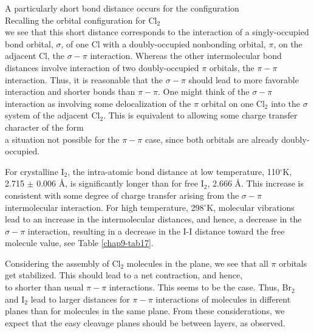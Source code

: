 A particularly short bond distance occurs for the configuration
\begin{equation}
\label{chap9-eqno16}
\end{equation}
Recalling the orbital configuration for Cl$_2$
\begin{equation}
\label{chap9-eqno17}
\end{equation}
we see that this short distance corresponds to the interaction of a 
singly-occupied bond orbital, $\sigma$, of one Cl with a doubly-occupied 
nonbonding orbital, $\pi$, on the adjacent Cl, the $\sigma - \pi$ 
interaction.  Whereas the other intermolecular bond distances involve 
interaction of two doubly-occupied $\pi$ orbitals, the $\pi-\pi$ 
interaction.  Thus, it is reasonable that the $\sigma-\pi$ should lead to more
favorable interaction and shorter bonds than $\pi-\pi$.  One might 
think of the $\sigma-\pi$ interaction as involving some delocalization of 
the $\pi$ orbital on one Cl$_2$ into the $\sigma$ system of the adjacent 
Cl$_2$. This is equivalent to allowing some charge transfer character of 
the form
\begin{equation}
\label{chap9-eqno18}
\end{equation}
a situation not possible for the $\pi-\pi$ case, since both orbitals 
are already doubly-occupied.

For crystalline I$_2$, the intra-atomic bond distance at low temperature, 
110$^{\circ}$K, 2.715 $\pm$ 0.006 \AA, is significantly longer than for 
free I$_2$, 2.666 \AA.  This increase is consistent with some degree
of charge transfer arising from the $\sigma-\pi$ intermolecular 
interaction.  For high temperature, 298$^{\circ}$K, molecular vibrations 
lead to an increase in the intermolecular distances, and hence, a decrease in
the $\sigma-\pi$ interaction, resulting in a decrease in the I-I distance 
toward the free molecule value, see Table \ref{chap9-tab17}.

Considering the assembly of Cl$_2$ molecules in the plane, we see that 
all $\pi$ orbitals get stabilized.  This should lead to a net 
contraction, and hence,
\begin{equation}
\label{chap9-eqno19}
\end{equation}
to shorter than usual $\pi-\pi$ interactions.  This seems to be the 
case.  Thus, Br$_2$ and I$_2$ lead to larger distances for $\pi-\pi$ 
interactions of molecules in different planes than for molecules in 
the same plane.  From these considerations, we expect that the easy 
cleavage planes should be between layers, as observed.

